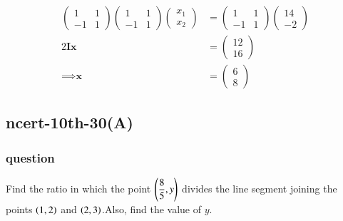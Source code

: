 \documentclass[journal,12pt,onecolumn]{IEEEtran}
\theoremstyle{remark}
\begin{document}
    \begin{align}
            \begin{pmatrix}
        1 & 1\\
        -1 & 1
    \end{pmatrix}
    \begin{pmatrix}
        1 & 1\\
        -1 & 1
    \end{pmatrix}
    \begin{pmatrix}
        x_1\\
        x_2
    \end{pmatrix} &= 
    \begin{pmatrix}
        1 & 1\\
        -1 & 1
    \end{pmatrix}
    \begin{pmatrix}
        14\\
        -2
    \end{pmatrix} \\
    2\textbf{I}\textbf{x} &= \begin{pmatrix}
        12\\
        16
    \end{pmatrix}\\
    \implies \textbf{x} &= \begin{pmatrix}
        6\\
        8
    \end{pmatrix}
\end{align}
\subsection{ncert-10th-30(A)}
\subsubsection{question}
Find the ratio in which the point $\left(\dfrac{8}{5},y\right)$ divides the line segment joining the points $\left(1,2\right)$ and $\left(2,3\right)$.Also, find the value of $y$.  
\end{document}
